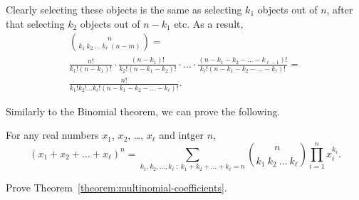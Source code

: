 Clearly selecting these objects is the same as selecting $k_1$ objects out of
$n$, after that selecting $k_2$ objects out of $n - k_1$ etc. As a result,
\begin{multline*}
  \binom{n}{k_1 \ k_2 \ \dots \ k_\ell \ (n - m)} = \\
  \frac{n!}{k_1! (n - k_1)!} \cdot \frac{(n - k_1)!}{k_2! (n - k_1 - k_2)!}
  \cdot \ldots \cdot
  \frac{
    (n - k_1 - k_2 - \dots - k_{\ell - 1})!
  }{
    k_\ell! (n - k_1 - k_2 - \dots - k_\ell)!
  } = \\
  \frac{n!}{k_1! k_2! \dots k_\ell! (n - k_1 - k_2 - \dots - k_\ell)!}.
\end{multline*}

Similarly to the Binomial theorem, we can prove the following.
\begin{theorem}
\label{theorem:multinomial-coefficients}
  For any real numbers $x_1$, $x_2$, \dots, $x_\ell$ and intger $n$,
  \[
    (x_1 + x_2 + \dots + x_\ell)^n =
    \sum_{k_1, k_2, \dots, k_\ell ~:~ k_1 + k_2 + \dots + k_\ell = n}
      \binom{n}{k_1 \ k_2 \ \dots \ k_\ell} \prod_{i = 1}^n x_i^{k_i}.
  \]
\end{theorem}

\begin{exercise}
  Prove Theorem~\ref{theorem:multinomial-coefficients}.
\end{exercise}

